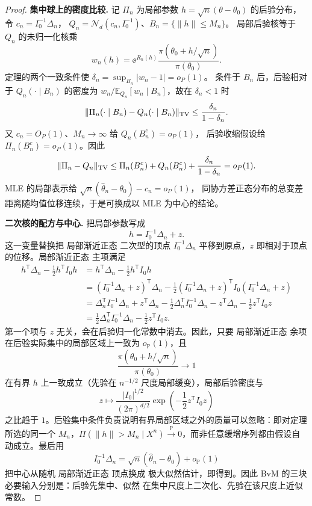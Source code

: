 \begin{proof}
\textbf{集中球上的密度比较.} 记 $\Pi_n$ 为局部参数 $h=\sqrt n(\theta-\theta_0)$ 的后验分布，令 $c_n=I_0^{-1}\Delta_n$，
$Q_n=\mathcal N_d(c_n,I_0^{-1})$、$B_n=\{\|h\|\le M_n\}$。
局部后验核等于 $Q_n$ 的未归一化核乘
\[
 w_n(h)=\ee^{R_n(h)}\frac{\pi(\theta_0+h/\sqrt n)}{\pi(\theta_0)}.
\]
定理的两个一致条件使 $\delta_n=\sup_{B_n}|w_n-1|=o_P(1)$。
条件于 $B_n$ 后，后验相对于 $Q_n(\cdot\mid B_n)$ 的密度为
$w_n/\mathbb E_{Q_n}[w_n\mid B_n]$，故在 $\delta_n<1$ 时
\[
 \|\Pi_n(\cdot\mid B_n)-Q_n(\cdot\mid B_n)\|_{\rm TV}
 \le\frac{\delta_n}{1-\delta_n}.
\]
又 $c_n=O_P(1)$、$M_n\to\infty$ 给 $Q_n(B_n^c)=o_P(1)$，
后验收缩假设给 $\Pi_n(B_n^c)=o_P(1)$。因此
\[
 \|\Pi_n-Q_n\|_{\rm TV}
 \le\Pi_n(B_n^c)+Q_n(B_n^c)+\frac{\delta_n}{1-\delta_n}=o_P(1).
\]
MLE 的局部表示给 $\sqrt n(\widehat\theta_n-\theta_0)-c_n=o_P(1)$，
同协方差正态分布的总变差距离随均值位移连续，于是可换成以 MLE 为中心的结论。

\textbf{二次核的配方与中心.} 把局部参数写成
\[
 h=I_0^{-1}\Delta_n+z.
\]
这一变量替换把 局部渐近正态 二次型的顶点 $I_0^{-1}\Delta_n$ 平移到原点，$z$ 即相对于顶点的位移。局部渐近正态 主项满足
\[
 \begin{aligned}
 h^{\mathsf T}\Delta_n-\frac12h^{\mathsf T}I_0h
 &=h^{\mathsf T}\Delta_n-\frac12h^{\mathsf T}I_0h\\
 &=(I_0^{-1}\Delta_n+z)^{\mathsf T}\Delta_n
   -\frac12(I_0^{-1}\Delta_n+z)^{\mathsf T}I_0(I_0^{-1}\Delta_n+z)\\
 &=\Delta_n^{\mathsf T}I_0^{-1}\Delta_n+z^{\mathsf T}\Delta_n
   -\frac12\Delta_n^{\mathsf T}I_0^{-1}\Delta_n
   -z^{\mathsf T}\Delta_n
   -\frac12z^{\mathsf T}I_0z\\
 &=\frac12\Delta_n^{\mathsf T}I_0^{-1}\Delta_n
   -\frac12z^{\mathsf T}I_0z.
 \end{aligned}
\]
第一个项与 $z$ 无关，会在后验归一化常数中消去。因此，只要 局部渐近正态 余项在后验实际集中的局部区域上一致为 $o_{\mathbb P}(1)$，且
\[
 \frac{\pi(\theta_0+h/\sqrt n)}{\pi(\theta_0)}\to1
\]
在有界 $h$ 上一致成立（先验在 $n^{-1/2}$ 尺度局部缓变），局部后验密度与
\[
 z\mapsto
 \frac{|I_0|^{1/2}}{(2\pi)^{d/2}}
 \exp\!\left(-\frac12z^{\mathsf T}I_0z\right)
\]
之比趋于 $1$。后验集中条件负责说明有界局部区域之外的质量可以忽略：即对定理所选的同一个 $M_n$，$\Pi(\|h\|>M_n\mid X^n)\xrightarrow{\mathbb P}0$，而非任意缓增序列都由假设自动成立。最后用
\[
 I_0^{-1}\Delta_n
 =\sqrt n(\widehat\theta_n-\theta_0)+o_{\mathbb P}(1)
\]
把中心从随机 局部渐近正态 顶点换成 极大似然估计，即得到。因此 BvM 的三块必要输入分别是：后验先集中、似然 在集中尺度上二次化、先验在该尺度上近似常数。
\end{proof}

